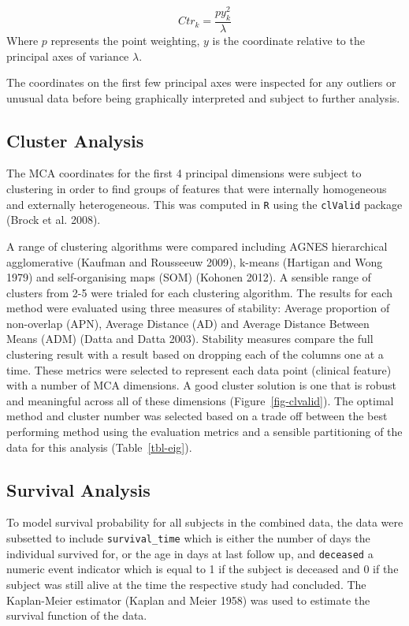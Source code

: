 \documentclass[
  letterpaper,
  DIV=11,
  numbers=noendperiod]{scrartcl}
\begin{document}
\[
Ctr_k = \frac{py_k^2}{\lambda}
\] Where \(p\) represents the point weighting, \(y\) is the coordinate
relative to the principal axes of variance \(\lambda\).

The coordinates on the first few principal axes were inspected for any
outliers or unusual data before being graphically interpreted and
subject to further analysis.

\hypertarget{cluster-analysis}{%
\subsection{Cluster Analysis}\label{cluster-analysis}}

The MCA coordinates for the first 4 principal dimensions were subject to
clustering in order to find groups of features that were internally
homogeneous and externally heterogeneous. This was computed in
\texttt{R} using the \texttt{clValid} package (Brock et al. 2008).

A range of clustering algorithms were compared including AGNES
hierarchical agglomerative (Kaufman and Rousseeuw 2009), k-means
(Hartigan and Wong 1979) and self-organising maps (SOM) (Kohonen 2012).
A sensible range of clusters from 2-5 were trialed for each clustering
algorithm. The results for each method were evaluated using three
measures of stability: Average proportion of non-overlap (APN), Average
Distance (AD) and Average Distance Between Means (ADM) (Datta and Datta
2003). Stability measures compare the full clustering result with a
result based on dropping each of the columns one at a time. These
metrics were selected to represent each data point (clinical feature)
with a number of MCA dimensions. A good cluster solution is one that is
robust and meaningful across all of these dimensions
(Figure~\ref{fig-clvalid}). The optimal method and cluster number was
selected based on a trade off between the best performing method using
the evaluation metrics and a sensible partitioning of the data for this
analysis (Table~\ref{tbl-eig}).

\hypertarget{survival-analysis}{%
\subsection{Survival Analysis}\label{survival-analysis}}

To model survival probability for all subjects in the combined data, the
data were subsetted to include \texttt{survival\_time} which is either
the number of days the individual survived for, or the age in days at
last follow up, and \texttt{deceased} a numeric event indicator which is
equal to 1 if the subject is deceased and 0 if the subject was still
alive at the time the respective study had concluded. The Kaplan-Meier
estimator (Kaplan and Meier 1958) was used to estimate the survival
function of the data.
\end{document}

